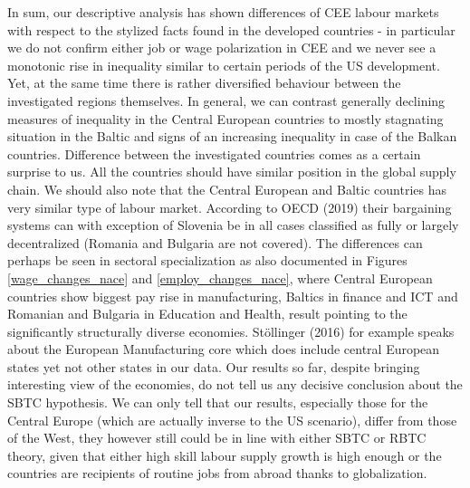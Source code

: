 \documentclass{article}
\begin{document}
In sum, our descriptive analysis has shown differences of CEE labour markets with respect to the stylized facts found in the developed countries - in particular we do not confirm either job or wage polarization in CEE and we never see a monotonic rise in inequality similar to certain periods of the US development. Yet, at the same time there is rather diversified behaviour between the investigated regions themselves. In general, we can contrast generally declining measures of inequality in the Central European countries to mostly stagnating situation in the Baltic and signs of an increasing inequality in case of the Balkan countries.
Difference between the investigated countries comes as a certain surprise to us. All the countries should have similar position in the global supply chain. We should also note that the Central European and Baltic countries has very similar type of labour market. According to OECD (2019) their bargaining systems can with exception of Slovenia be in all cases classified as fully or largely decentralized (Romania and Bulgaria are not covered).
The differences can perhaps be seen in sectoral specialization as also documented in Figures \ref{wage_changes_nace} and \ref{employ_changes_nace}, where Central European countries show biggest pay rise in manufacturing, Baltics in finance and ICT and Romanian and Bulgaria in Education and Health, result pointing to the significantly structurally diverse economies. Stöllinger (2016) for example speaks about the European Manufacturing core which does include central European states yet not other states in our data.
Our results so far, despite bringing interesting view of the economies, do not tell us any decisive conclusion about the SBTC hypothesis. We can only tell that our results, especially those for the Central Europe (which are actually inverse to the US scenario), differ from those of the West, they however still could be in line with either SBTC or RBTC theory, given that either high skill labour supply growth is high enough or the countries are recipients of routine jobs from abroad thanks to globalization.
\end{document}
